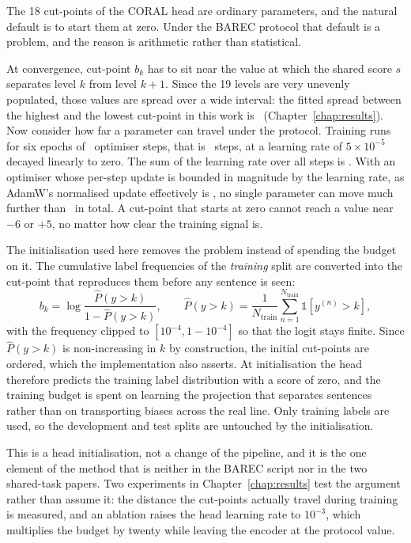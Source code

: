 The 18 cut-points of the CORAL head are ordinary parameters, and the natural default is to
start them at zero. Under the BAREC protocol that default is a problem, and the reason is
arithmetic rather than statistical.

At convergence, cut-point $b_k$ has to sit near the value at which the shared score $s$
separates level $k$ from level $k+1$. Since the 19 levels are very unevenly populated, those
values are spread over a wide interval: the fitted spread between the highest and the lowest
cut-point in this work is \cutSpreadCoral\ (Chapter~\ref{chap:results}). Now consider how far a
parameter can travel under the protocol. Training runs for six epochs of \stepsPerEpoch\
optimiser steps, that is \gpuTotalSteps\ steps, at a learning rate of $5\times10^{-5}$ decayed
linearly to zero. The sum of the learning rate over all steps is \lrSumEncoder. With an
optimiser whose per-step update is bounded in magnitude by the learning rate, as AdamW's
normalised update effectively is \cite{loshchilov2019adamw}, no single parameter can move much
further than \lrSumEncoder\ in total. A cut-point that starts at zero cannot reach a value near
$-6$ or $+5$, no matter how clear the training signal is.

The initialisation used here removes the problem instead of spending the budget on it. The
cumulative label frequencies of the \emph{training} split are converted into the cut-point that
reproduces them before any sentence is seen:
\begin{equation}
b_k = \log \frac{\hat{P}(y>k)}{1-\hat{P}(y>k)}, \qquad
\hat{P}(y>k) = \frac{1}{N_{\text{train}}}\sum_{n=1}^{N_{\text{train}}}\mathbb{1}\left[y^{(n)}>k\right],
\label{eq:coral-init}
\end{equation}
with the frequency clipped to $[10^{-4}, 1-10^{-4}]$ so that the logit stays finite. Since
$\hat{P}(y>k)$ is non-increasing in $k$ by construction, the initial cut-points are ordered,
which the implementation also asserts. At initialisation the head therefore predicts the
training label distribution with a score of zero, and the training budget is spent on learning
the projection that separates sentences rather than on transporting biases across the real
line. Only training labels are used, so the development and test splits are untouched by the
initialisation.

This is a head initialisation, not a change of the pipeline, and it is the one element of the
method that is neither in the BAREC script nor in the two shared-task papers. Two experiments
in Chapter~\ref{chap:results} test the argument rather than assume it: the distance the
cut-points actually travel during training is measured, and an ablation raises the head
learning rate to $10^{-3}$, which multiplies the budget by twenty while leaving the encoder at
the protocol value.

